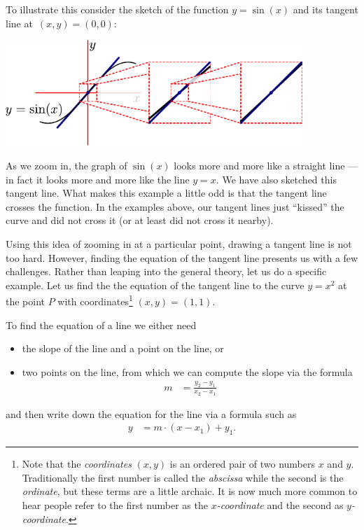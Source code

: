 To illustrate this consider the sketch of the function $y = \sin(x)$ and its
tangent line at~$(x,y)=(0,0)$:
\begin{fig}
\begin{center}
 \includegraphics[height=4cm]{tang1d}
\end{center}
\end{fig}
As we zoom in, the graph of $\sin(x)$ looks more and more like a straight line
--- in fact it looks more and more like the line $y=x$. We have also sketched
this tangent line. What makes this example a little odd is that the tangent
line crosses the function. In the examples above, our tangent lines just
``kissed'' the curve and did not cross it (or at least did not cross it
nearby).

Using this idea of zooming in at a particular point, drawing a tangent line is
not too hard. However,  finding the equation of the tangent line presents us
with a few challenges. Rather than leaping into the general  theory, let us do a
specific example. Let us find the the equation of the tangent line to the curve
$y=x^2$ at the point $P$ with coordinates\footnote{
Note that the \emph{coordinates} $(x,y)$ is an ordered pair of two numbers $x$
and $y$. Traditionally the first number is called the \emph{abscissa} while the
second is the \emph{ordinate}, but these terms are a little archaic. It is now
much more common to hear people refer to the first number as
the \emph{$x$-coordinate} and the second as \emph{$y$-coordinate}.}
$(x,y)=(1,1)$.

To find the equation of a line we either need
\begin{itemize}
 \item the slope of the line and a point on the line, or
 \item two points on the line, from which we can compute the slope via the
formula
\begin{align*}
  m &= \frac{y_2 - y_1}{x_2 - x_1}
\end{align*}
\end{itemize}
and then write down the equation for the line via a formula such as
\begin{align*}
  y &= m \cdot(x - x_1) + y_1.
\end{align*}


